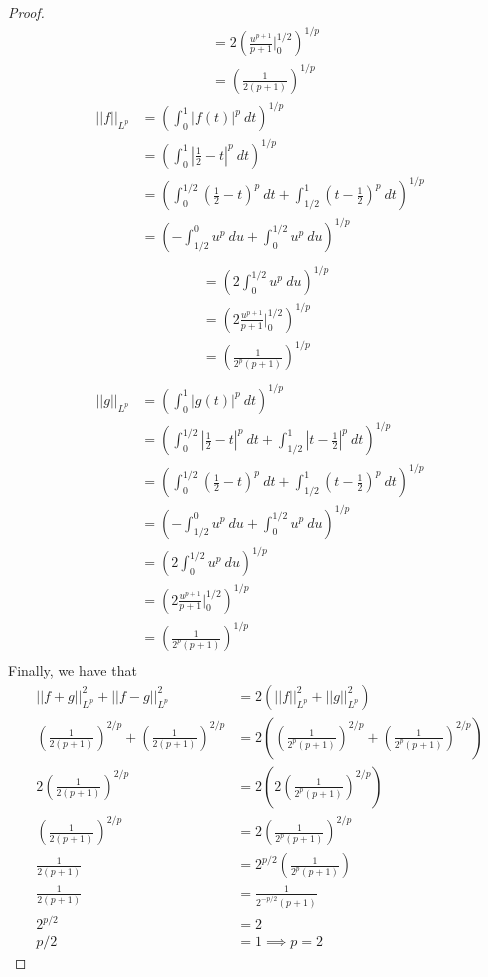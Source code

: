 \documentclass{article}
\newcommand{\norm}[1]{\left|\left|#1\right|\right|}
\newcommand{\abs}[1]{\left|#1\right|}
\newcommand{\parens}[1]{\left(#1\right)}
\begin{document}
\begin{proof}
\begin{align*}
    &= 2\parens{\frac{u^{p+1}}{p+1}\Bigg|_0^{1/2}}^{1/p} \\ 
    &= \parens{\frac{1}{2(p+1)}}^{1/p}
    \end{align*}
    \begin{align*}
    \norm{f}_{L^p} &= \parens{\int_0^1 \abs{f(t)}^p\ dt}^{1/p} \\
    &= \parens{\int_0^1 \abs{\frac{1}{2}-t}^p\ dt}^{1/p} \\
    &= \parens{\int_0^{1/2} \parens{\frac{1}{2} -t}^p\ dt + 
    \int_{1/2}^1 \parens{t-\frac{1}{2}}^p\ dt}^{1/p} \\
    &= \parens{-\int_{1/2}^0 u^p\ du + \int_0^{1/2} u^p\ du}^{1/p} \\
    \end{align*}
    \begin{align*}
    &= \parens{2\int_0^{1/2} u^p\ du}^{1/p} \\
    &= \parens{2\frac{u^{p+1}}{p+1}\Bigg|_0^{1/2}}^{1/p} \\
    &= \parens{\frac{1}{2^p(p+1)}}^{1/p} \\
    \end{align*}
    \begin{align*}
    \norm{g}_{L^p} &= \parens{\int_0^1 \abs{g(t)}^p\ dt}^{1/p} \\
    &= \parens{\int_0^{1/2} \abs{\frac{1}{2} -t}^p\ dt + 
    \int_{1/2}^1 \abs{t-\frac{1}{2}}^p\ dt}^{1/p} \\
    &= \parens{\int_0^{1/2} \parens{\frac{1}{2} -t}^p\ dt + 
    \int_{1/2}^1 \parens{t-\frac{1}{2}}^p\ dt}^{1/p} \\
    &= \parens{-\int_{1/2}^0 u^p\ du + \int_0^{1/2} u^p\ du}^{1/p} \\
    &= \parens{2\int_0^{1/2} u^p\ du}^{1/p} \\
    &= \parens{2\frac{u^{p+1}}{p+1}\Bigg|_0^{1/2}}^{1/p} \\
    &= \parens{\frac{1}{2^p(p+1)}}^{1/p} \\
    \end{align*}
    Finally, we have that 
    \begin{align*}
    \norm{f+g}_{L^p}^2 + \norm{f-g}_{L^p}^2 &= 2\parens{\norm{f}_{L^p}^2 + \norm{g}_{L^p}^2} \\
    \parens{\frac{1}{2(p+1)}}^{2/p} + \parens{\frac{1}{2(p+1)}}^{2/p} &=
    2\parens{\parens{\frac{1}{2^p(p+1)}}^{2/p} + \parens{\frac{1}{2^p(p+1)}}^{2/p}} \\
    2\parens{\frac{1}{2(p+1)}}^{2/p} &= 2\parens{2\parens{\frac{1}{2^p(p+1)}}^{2/p}} \\
    \parens{\frac{1}{2(p+1)}}^{2/p} &= 2\parens{\frac{1}{2^p(p+1)}}^{2/p} \\
    \frac{1}{2(p+1)} &= 2^{p/2}\parens{\frac{1}{2^p(p+1)}} \\
    \frac{1}{2(p+1)} &= \frac{1}{2^{-p/2}(p+1)} \\
    2^{p/2} &= 2 \\
    p/2 &= 1 \implies p = 2
    \end{align*}
    \pagebreak


\end{proof}
\end{document}
